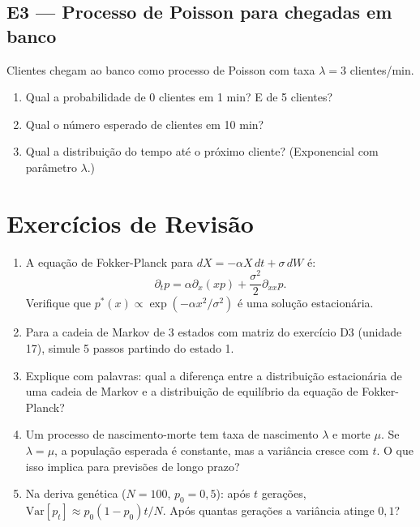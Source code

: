 \documentclass[12pt,a4paper]{article}
\begin{document}
\subsection*{E3 --- Processo de Poisson para chegadas em banco}
Clientes chegam ao banco como processo de Poisson com taxa $\lambda = 3$ clientes/min.
\begin{enumerate}
  \item[$a.$] Qual a probabilidade de 0 clientes em 1 min? E de 5 clientes?
  \item[$b.$] Qual o n\'umero esperado de clientes em 10 min?
  \item[$c.$] Qual a distribui\c{c}\~ao do tempo at\'e o pr\'oximo cliente? (Exponencial com par\^ametro $\lambda$.)
\end{enumerate}

\section*{Exerc\'icios de Revis\~ao}

\begin{enumerate}
  \item A equa\c{c}\~ao de Fokker-Planck para $dX = -\alpha X\,dt + \sigma\,dW$ \'e:
  \[
  \partial_t p = \alpha\partial_x(xp) + \frac{\sigma^2}{2}\partial_{xx}p.
  \]
  Verifique que $p^*(x) \propto \exp(-\alpha x^2/\sigma^2)$ \'e uma solu\c{c}\~ao estacion\'aria.
  
  \item Para a cadeia de Markov de 3 estados com matriz do exerc\'icio D3 (unidade 17), simule 5 passos partindo do estado 1.
  
  \item Explique com palavras: qual a diferen\c{c}a entre a distribui\c{c}\~ao estacion\'aria de uma cadeia de Markov e a distribui\c{c}\~ao de equil\'ibrio da equa\c{c}\~ao de Fokker-Planck?
  
  \item Um processo de nascimento-morte tem taxa de nascimento $\lambda$ e morte $\mu$. Se $\lambda = \mu$, a popula\c{c}\~ao esperada \'e constante, mas a vari\^ancia cresce com $t$. O que isso implica para previs\~oes de longo prazo?
  
  \item Na deriva gen\'etica ($N=100$, $p_0=0{,}5$): ap\'os $t$ gera\c{c}\~oes, $\text{Var}[p_t] \approx p_0(1-p_0)t/N$. Ap\'os quantas gera\c{c}\~oes a vari\^ancia atinge $0{,}1$?
\end{enumerate}
\end{document}
